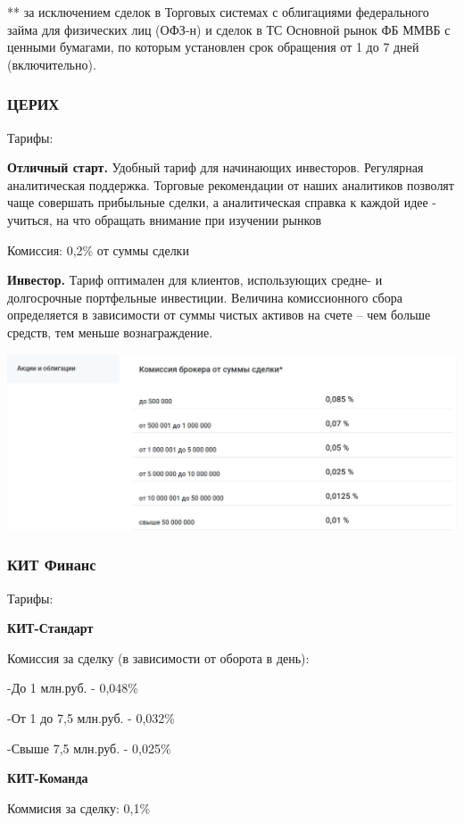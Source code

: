 **  за исключением сделок в Торговых системах с облигациями федерального займа для физических лиц (ОФЗ-н) и сделок в ТС Основной рынок ФБ ММВБ с ценными бумагами, по которым установлен срок обращения от 1 до 7 дней (включительно).

\subsubsection{ЦЕРИХ}

Тарифы:

\textbf{Отличный старт.} Удобный тариф для начинающих инвесторов. Регулярная аналитическая поддержка. Торговые рекомендации от наших аналитиков позволят чаще совершать прибыльные сделки, а аналитическая справка к каждой идее - учиться, на что обращать внимание при изучении рынков

Комиссия: 0,2\% от суммы сделки

\textbf{Инвестор.} Тариф оптимален для клиентов, использующих средне- и долгосрочные портфельные инвестиции. Величина комиссионного сбора определяется в зависимости от суммы чистых активов на счете – чем больше средств, тем меньше вознаграждение.

\includegraphics[width=16cm]{pics/alina/cerih_invest.png}

\subsubsection{КИТ Финанс}

Тарифы:

\textbf{КИТ-Стандарт}

Комиссия за сделку (в зависимости от оборота в день):

-До 1 млн.руб. - 0,048\%

-От 1 до 7,5 млн.руб. - 0,032\%

-Свыше 7,5 млн.руб. - 0,025\%

\textbf{КИТ-Команда}

Коммисия за сделку: 0,1\%

